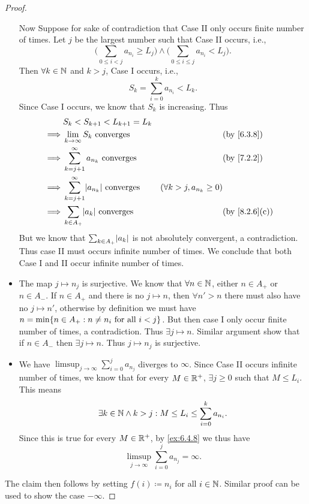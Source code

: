 \begin{proof}
\begin{itemize}
          Now Suppose for sake of contradiction that Case II only occurs finite number of times.
          Let \(j\) be the largest number such that Case II occurs, i.e.,
          \[
            \Bigg(\sum_{0 \leq i < j} a_{n_i} \geq L_j\Bigg) \land \Bigg(\sum_{0 \leq i \leq j} a_{n_i} < L_j\Bigg).
          \]
          Then \(\forall k \in \mathbb{N}\) and \(k > j\), Case I occurs, i.e.,
          \[
            S_k = \sum_{i = 0}^k a_{n_i} < L_k.
          \]
          Since Case I occurs, we know that \(S_k\) is increasing.
          Thus
          \begin{align*}
                     & S_k < S_{k + 1} < L_{k + 1} = L_k                                                                                       \\
            \implies & \lim_{k \to \infty} S_k \text{ converges}               &                                 & \by{6.3.8}                  \\
            \implies & \sum_{k = j + 1}^\infty a_{n_k} \text{ converges}       &                                 & \by{7.2.2}                  \\
            \implies & \sum_{k = j + 1}^\infty \abs{a_{n_k}} \text{ converges} & (\forall k > j, a_{n_k} \geq 0)                               \\
            \implies & \sum_{k \in A_+} \abs{a_k} \text{ converges}            &                                 & \text{(by \cref{8.2.6}(c))}
          \end{align*}
          But we know that \(\sum_{k \in A_+} \abs{a_k}\) is not absolutely convergent, a contradiction.
          Thus case II must occurs infinite number of times.
          We conclude that both Case I and II occur infinite number of times.
    \item The map \(j \mapsto n_j\) is surjective.
          We know that \(\forall n \in \mathbb{N}\), either \(n \in A_+\) or \(n \in A_-\).
          If \(n \in A_+\) and there is no \(j \mapsto n\), then \(\forall n' > n\) there must also have no \(j \mapsto n'\), otherwise by definition we must have \(n = \min\set{n \in A_+ : n \neq n_i \text{ for all } i < j}\).
          But then case I only occur finite number of times, a contradiction.
          Thus \(\exists j \mapsto n\).
          Similar argument show that if \(n \in A_-\) then \(\exists j \mapsto n\).
          Thus \(j \mapsto n_j\) is surjective.
    \item We have \(\limsup_{j \to \infty} \sum_{i = 0}^j a_{n_j}\) diverges to \(\infty\).
          Since Case II occurs infinite number of times, we know that for every \(M \in \mathbb{R}^+\), \(\exists j \geq 0\) such that \(M \leq L_i\).
          This means
          \[
            \exists k \in \mathbb{N} \land k > j : M \leq L_i \leq \sum_{i = 0}^k a_{n_i}.
          \]
          Since this is true for every \(M \in \mathbb{R}^+\), by \cref{ex:6.4.8} we thus have
          \[
            \limsup_{j \to \infty} \sum_{i = 0}^j a_{n_j} = \infty.
          \]
  \end{itemize}
  The claim then follows by setting \(f(i) \coloneqq n_i\) for all \(i \in \mathbb{N}\).
  Similar proof can be used to show the case \(-\infty\).
\end{proof}